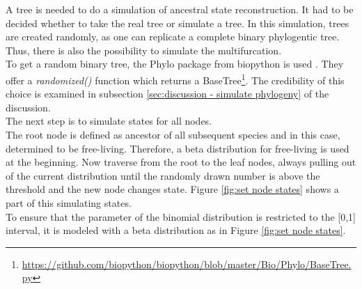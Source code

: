     A tree is needed to do a simulation of ancestral state reconstruction. It had to be decided whether 
      to take the real tree or simulate a tree. In this simulation, trees are created randomly, as 
      one can replicate a complete binary phylogentic tree. Thus, there is also the possibility to 
      simulate the multifurcation. \\
    To get a random binary tree, the Phylo package from biopython is used \cite{Cock2009}. They offer 
      a \textit{randomized()} function which returns a BaseTree\footnote{
        \hyperlink{https://github.com/biopython/biopython/blob/master/Bio/Phylo/BaseTree.py}
        {https://github.com/biopython/biopython/blob/master/Bio/Phylo/BaseTree.py}
      }. The credibility of this choice is examined in subsection 
        \ref{sec:discussion - simulate phylogeny} of the discussion.\\

    The next step is to simulate states for all nodes. \\
    The root node is defined as ancestor of all subsequent species and in this case, determined to be
      free-living. Therefore, a beta distribution for free-living is used at the beginning. Now 
      traverse from the root to the leaf nodes, always pulling out of the current distribution until 
      the randomly drawn number is above the threshold and the new node changes state. Figure 
      \ref{fig:set node states} shows a part of this simulating states. \\
    To ensure that the parameter of the binomial distribution is restricted to the [0,1] interval, it 
      is modeled with a beta distribution as in Figure \ref{fig:set node states}. \\

